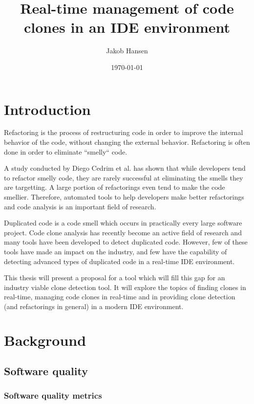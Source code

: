 \documentclass[12pt]{article}
\title{Real-time management of code clones in an IDE environment}
\author{Jakob Hansen}
\date{\today}
\begin{document}
\maketitle

\tableofcontents

\section{Introduction}

Refactoring is the process of restructuring code in order to improve the internal behavior
of the code, without changing the external behavior.\cite[9]{fowlerrefactoring} Refactoring
is often done in order to eliminate ``smelly`` code.

A study conducted by Diego Cedrim et al.\cite{Rohit_Gheyi_Impact} has shown that while
developers tend to refactor smelly code, they are rarely successful at eliminating the
smells they are targetting. A large portion of refactorings even tend to make the code
smellier. Therefore, automated tools to help developers make better refactorings and code
analysis is an important field of research.

Duplicated code is a code smell which occurs in practically every large software project.
Code clone analysis has recently become an active field of research and many tools have
been developed to detect duplicated code.\cite{Inoue_introduction_to_cc} However, few of
these tools have made an impact on the industry, and few have the capability of detecting
advanced types of duplicated code in a real-time IDE environment. 

This thesis will present a proposal for a tool which will fill this gap for an industry viable
clone detection tool. It will explore the topics of finding clones in real-time, managing
code clones in real-time and in providing clone detection (and refactorings in general) in
a modern IDE environment.

\section{Background}

\subsection{Software quality}

\subsubsection{Software quality metrics}
\end{document}
